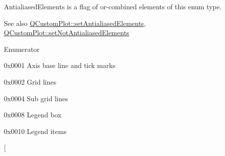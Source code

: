 {\ttfamily Antialiased\+Elements} is a flag of or-\/combined elements of this enum type.

\begin{DoxySeeAlso}{See also}
\hyperlink{class_q_custom_plot_af6f91e5eab1be85f67c556e98c3745e8}{Q\+Custom\+Plot\+::set\+Antialiased\+Elements}, \hyperlink{class_q_custom_plot_ae10d685b5eabea2999fb8775ca173c24}{Q\+Custom\+Plot\+::set\+Not\+Antialiased\+Elements} 
\end{DoxySeeAlso}
\begin{Desc}
\item[Enumerator]\par
\begin{description}
\item[{\em 
ae\+Axes\hypertarget{namespace_q_c_p_ae55dbe315d41fe80f29ba88100843a0caefa92e89cd37f8a081fd2075aa1af73f}{}\label{namespace_q_c_p_ae55dbe315d41fe80f29ba88100843a0caefa92e89cd37f8a081fd2075aa1af73f}
}]{\ttfamily 0x0001} Axis base line and tick marks \item[{\em 
ae\+Grid\hypertarget{namespace_q_c_p_ae55dbe315d41fe80f29ba88100843a0ca4fbb37118d62288af0ca601ff2b07a2f}{}\label{namespace_q_c_p_ae55dbe315d41fe80f29ba88100843a0ca4fbb37118d62288af0ca601ff2b07a2f}
}]{\ttfamily 0x0002} Grid lines \item[{\em 
ae\+Sub\+Grid\hypertarget{namespace_q_c_p_ae55dbe315d41fe80f29ba88100843a0caaedf83369188a15a69f92bb1d85ca97b}{}\label{namespace_q_c_p_ae55dbe315d41fe80f29ba88100843a0caaedf83369188a15a69f92bb1d85ca97b}
}]{\ttfamily 0x0004} Sub grid lines \item[{\em 
ae\+Legend\hypertarget{namespace_q_c_p_ae55dbe315d41fe80f29ba88100843a0ca9e0127a6361b5d0596b031a482c5cf97}{}\label{namespace_q_c_p_ae55dbe315d41fe80f29ba88100843a0ca9e0127a6361b5d0596b031a482c5cf97}
}]{\ttfamily 0x0008} Legend box \item[{\em 
ae\+Legend\+Items\hypertarget{namespace_q_c_p_ae55dbe315d41fe80f29ba88100843a0ca1aca7a50c1b95403958733a4acafe773}{}\label{namespace_q_c_p_ae55dbe315d41fe80f29ba88100843a0ca1aca7a50c1b95403958733a4acafe773}
}]{\ttfamily 0x0010} Legend items \item[{\em 
}
\end{description}
\end{Desc}
